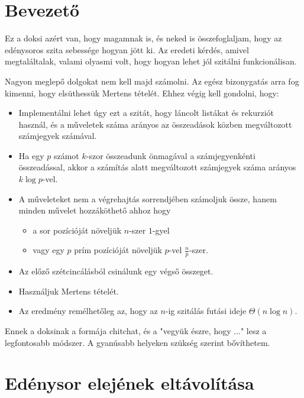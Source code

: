 \documentclass{article}
\begin{document}
\tableofcontents

\section{Bevezető}

Ez a doksi azért van, hogy magamnak is, és neked is összefoglaljam, hogy az edénysoros szita sebessége hogyan jött ki.
Az eredeti kérdés, amivel megtaláltalak, valami olyasmi volt, hogy hogyan lehet jól szitálni funkcionálisan.

Nagyon meglepő dolgokat nem kell majd számolni.
Az egész bizonygatás arra fog kimenni, hogy elsüthessük Mertens tételét.
Ehhez végig kell gondolni, hogy:
\begin{itemize}
\item Implementálni lehet úgy ezt a szitát, hogy láncolt listákat és rekurziót használ, és a műveletek száma arányos az összeadások közben megváltozott számjegyek számával.

\item Ha egy $p$ számot $k$-szor összeadunk önmagával a számjegyenkénti összeadással, akkor a számítás alatt megváltozott számjegyek száma arányos $k\log{p}$-vel.

\item A műveleteket nem a végrehajtás sorrendjében számoljuk össze, hanem minden művelet hozzáköthető ahhoz hogy
\begin{itemize}
\item a sor pozícióját növeljük $n$-szer $1$-gyel

\item vagy egy $p$ prím pozícióját növeljük $p$-vel $\frac{n}{p}$-szer.
\end{itemize}

\item Az előző szétcincálásból csinálunk egy végső összeget.

\item Használjuk Mertens tételét.

\item Az eredmény remélhetőleg az, hogy az $n$-ig szitálás futási ideje $\Theta(n \log{n})$.
\end{itemize}

Ennek a doksinak a formája chitchat, és a "vegyük észre, hogy ..." lesz a legfontosabb módszer.
A gyanúsabb helyeken szükség szerint bővíthetem.

\section{Edénysor elejének eltávolítása}
\end{document}
